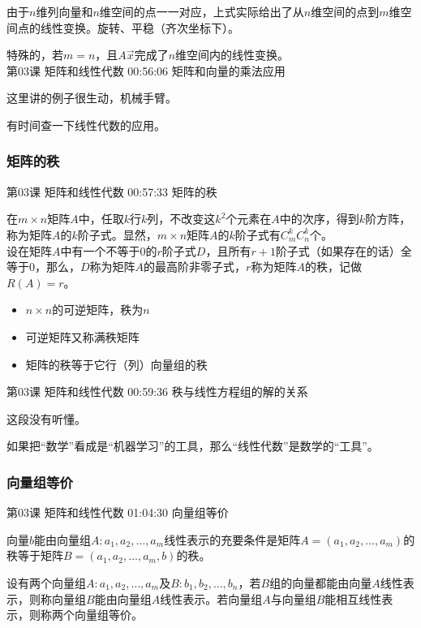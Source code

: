 \documentclass[UTF8]{ctexbook}
\begin{document}
由于$n$维列向量和$n$维空间的点一一对应，上式实际给出了从$n$维空间的点到$m$维空间点的线性变换。旋转、平稳（齐次坐标下）。

特殊的，若$m = n$，且$A\vec{x}$完成了$n$维空间内的线性变换。\\

第03课 矩阵和线性代数 00:56:06 矩阵和向量的乘法应用

这里讲的例子很生动，机械手臂。

有时间查一下线性代数的应用。


\subsubsection{矩阵的秩}

第03课 矩阵和线性代数 00:57:33 矩阵的秩

在$m \times n$矩阵$A$中，任取$k$行$k$列，不改变这$k^{2}$个元素在$A$中的次序，得到$k$阶方阵，称为矩阵$A$的$k$阶子式。显然，$m \times n$矩阵$A$的$k$阶子式有$C_{m}^{k}C_{n}^{k}$个。\\

设在矩阵$A$中有一个不等于0的$r$阶子式$D$，且所有$r+1$阶子式（如果存在的话）全等于0，那么，$D$称为矩阵$A$的最高阶非零子式，$r$称为矩阵$A$的秩，记做$R(A)=r$。

\begin{itemize}
\item $n \times n$的可逆矩阵，秩为$n$
\item 可逆矩阵又称满秩矩阵
\item 矩阵的秩等于它行（列）向量组的秩
\end{itemize}

第03课 矩阵和线性代数 00:59:36 秩与线性方程组的解的关系

这段没有听懂。

如果把“数学”看成是“机器学习”的工具，那么“线性代数”是数学的“工具”。

\subsubsection{向量组等价}

第03课 矩阵和线性代数 01:04:30 向量组等价

向量$b$能由向量组$A:a_{1},a_{2},\dots,a_{m}$线性表示的充要条件是矩阵$A=(a_{1},a_{2},\dots,a_{m})$的秩等于矩阵$B=(a_{1},a_{2},\dots,a_{m},b)$的秩。

设有两个向量组$A:a_{1},a_{2},\dots,a_{m}$及$B:b_{1},b_{2},\dots,b_{n}$，若$B$组的向量都能由向量$A$线性表示，则称向量组$B$能由向量组$A$线性表示。若向量组$A$与向量组$B$能相互线性表示，则称两个向量组等价。
\end{document}
